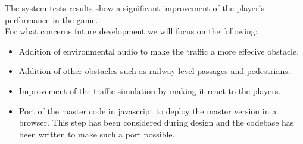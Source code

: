 \documentclass[12pt]{article}
\newcommand\blankpage{%
    \null
    \thispagestyle{empty}%
    \addtocounter{page}{-1}%
    \newpage}
\begin{document}
The system tests results show a significant improvement of the player's performance in the game. \\

For what concerns future development we will focus on the following:

\begin{itemize}
	\item Addition of environmental audio to make the traffic a more effecive obstacle.
	\item Addition of other obstacles such as railway level passages and pedestrians.
	\item Improvement of the traffic simulation by making it react to the players. 
	\item Port of the master code in javascript to deploy the master version in a browser. This step has been considered during design and the codebase has been written to make such a port possible.
\end{itemize}

\afterpage{\blankpage}

\clearpage



\end{document}
